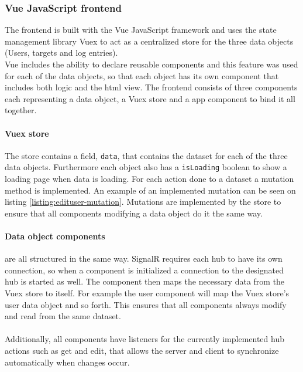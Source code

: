 \documentclass{article}
\begin{document}
\subsubsection{Vue JavaScript frontend}
The frontend is built with the Vue JavaScript framework\cite{url:implementation:vue} and uses the state management library Vuex\cite{url:implementation:vue:vuex} to act as a centralized store for the three data objects (Users, targets and log entries).
\\
Vue includes the ability to declare reusable components and this feature was used for each of the data objects, so that each object has its own component that includes both logic and the \gls{html} view. The frontend consists of three components each representing a data object, a Vuex store and a app component to bind it all together.

\paragraph{Vuex store}
The store contains a field, \texttt{data}, that contains the dataset for each of the three data objects. Furthermore each object also has a \texttt{isLoading} boolean to show a loading page when data is loading. For each action done to a dataset a mutation method is implemented. An example of an implemented mutation can be seen on listing \ref{listing:edituser-mutation}. Mutations are implemented by the store to ensure that all components modifying a data object do it the same way.


\paragraph{Data object components} are all structured in the same way. SignalR requires each hub to have its own connection, so when a component is initialized a connection to the designated hub is started as well. The component then maps the necessary data from the Vuex store to itself. For example the user component will map the Vuex store's user data object and so forth. This ensures that all components always modify and read from the same dataset.
\\\\
Additionally, all components have listeners for the currently implemented hub actions such as get and edit, that allows the server and client to synchronize automatically when changes occur.
\end{document}
